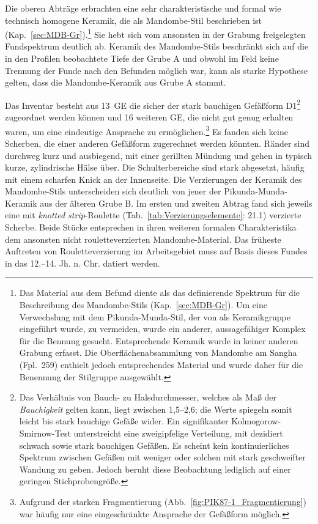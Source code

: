 \vspace{1em}
\noindent Die oberen Abträge erbrachten eine sehr charakteristische und formal wie technisch homogene Keramik, die als Mandombe-Stil beschrieben ist (Kap.~\ref{sec:MDB-Gr}).\footnote{Das Material aus dem Befund diente als das definierende Spektrum für die Beschreibung des Mandombe-Stils (Kap.~\ref{sec:MDB-Gr}). Um eine Verwechslung mit dem Pikunda-Munda-Stil, der von \textcite{Eggert.1992} als Keramikgruppe eingeführt wurde, zu vermeiden, wurde ein anderer, aussagefähiger Komplex für die Bennung gesucht. Entsprechende Keramik wurde in keiner anderen Grabung erfasst. Die Oberflächenabsammlung von Mandombe am \mbox{Sangha} (Fpl.~259) enthielt jedoch entsprechendes Material und wurde daher für die Benennung der Stilgruppe ausgewählt.} Sie hebt sich vom ansonsten in der Grabung freigelegten Fundspektrum deutlich ab. Keramik des Mandombe-Stils beschränkt sich auf die in den Profilen beobachtete Tiefe der Grube A und obwohl im Feld keine Trennung der Funde nach den Befunden möglich war, kann als starke Hypothese gelten, dass die Mandombe-Keramik aus Grube A stammt.

Das Inventar besteht aus 13~GE die sicher der stark bauchigen Gefäßform D1\footnote{Das Verhältnis von Bauch- zu Halsdurchmesser, welches als Maß der \textit{Bauchigkeit} gelten kann, liegt zwischen 1,5--2,6; die Werte spiegeln somit leicht bis stark bauchige Gefäße wider. Ein signifikanter Kolmogorow-Smirnow-Test unterstreicht eine zweigipfelige Verteilung, mit dezidiert schwach sowie stark bauchigen Gefäßen. Es scheint kein kontinuierliches Spektrum zwischen Gefäßen mit weniger oder solchen mit stark geschweifter Wandung zu geben. Jedoch beruht diese Beobachtung lediglich auf einer geringen Stichprobengröße.} zugeordnet werden können und 16 weiteren GE, die nicht gut genug erhalten waren, um eine eindeutige Ansprache zu ermöglichen.\footnote{Aufgrund der starken Fragmentierung (Abb.~\ref{fig:PIK87-1_Fragmentierung}) war häufig nur eine eingeschränkte Ansprache der Gefäßform möglich.} Es fanden sich keine Scherben, die einer anderen Gefäßform zugerechnet werden könnten. Ränder sind durchweg kurz und ausbiegend, mit einer gerillten Mündung und gehen in typisch kurze, zylindrische Hälse über. Die Schulterbereiche sind stark abgesetzt, häufig mit einem scharfen Knick an der Innenseite. Die Verzierungen der Keramik des Mandombe-Stils unterscheiden sich deutlich von jener der Pikunda-Munda-Keramik aus der älteren Grube B. Im ersten und zweiten Abtrag fand sich jeweils eine mit \textit{knotted strip}-Roulette (Tab.~\ref{tab:Verzierungselemente}: 21.1) verzierte Scherbe. Beide Stücke entsprechen in ihren weiteren formalen Charakteristika dem ansonsten nicht rouletteverzierten Mandombe-Material. Das früheste Auftreten von Rouletteverzierung im Arbeitsgebiet muss auf Basis dieses Fundes in das 12.--14. Jh. n. Chr. datiert werden.

